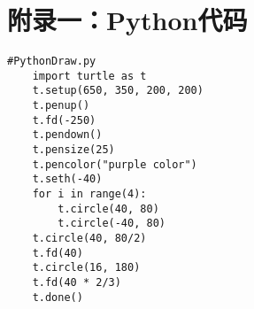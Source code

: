 \chapter{附录一：Python代码}

\begin{lstlisting}[style=python]
    #PythonDraw.py
    import turtle as t
    t.setup(650, 350, 200, 200)
    t.penup()
    t.fd(-250)
    t.pendown()
    t.pensize(25)
    t.pencolor("purple color")
    t.seth(-40)
    for i in range(4):
        t.circle(40, 80)
        t.circle(-40, 80)
    t.circle(40, 80/2)
    t.fd(40)
    t.circle(16, 180)
    t.fd(40 * 2/3)
    t.done()
\end{lstlisting}
